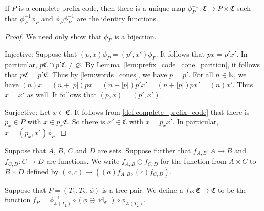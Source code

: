 \begin{lemma}\label{def:cantor_to_prefix_code_cantor}
  If \(P\) is a complete prefix code, then there is a unique map \(\phi_P^{-1}:\mathfrak{C}\to P\times \mathfrak{C}\) such that \(\phi_P^{-1}\phi_P\) and \(\phi_P\phi_P^{-1}\) are the identity functions.
\end{lemma}
\begin{proof}
    We need only show that \(\phi_P\) is a bijection.

    Injective: Suppose that \((p,x)\phi_P=(p',x')\phi_P\). It follows that \(px=p'x'\). In particular, \(p\mathfrak{C}\cap p'\mathfrak{C}\neq \varnothing\).
    By Lemma~\ref{lem:prefix_code=cone_parition}, it follows that \(p\mathfrak{C}= p'\mathfrak{C}\). 
    Thus by \cref{lem:words=cones}, we have \(p=p'\).
    For all \(n\in \mathbb{N}\), we have \((n)x=(n+|p|)px=(n+|p|)p'x'=(n+|p|)px'=(n)x'\). Thus \(x=x'\) as well. It follows that \((p,x)=(p',x')\).

    Surjective: Let \(x\in \mathfrak{C}\). It follows from \cref{def:complete_prefix_code} that there is \(p_x\in P\) with \(x\in p_x\mathfrak{C}\). So there is \(x'\in \mathfrak{C}\) with \(x=p_xx'\). In particular, \(x=(p_x,x')\phi_P\).
\end{proof}

\begin{definition}\label{def:direct_sum_of_functions}
    Suppose that \(A\), \(B\), \(C\) and \(D\) are sets. 
    Suppose further that \(f_{A,B}:A\to B\) and \(f_{C,D}:C\to D\) are functions.
    We write \(f_{A,B}\oplus f_{C,D}\) for the function from \(A\times C\) to \(B\times D\) defined by \((a,c)\mapsto ((a)f_{A,B},(c)f_{C,D})\).
\end{definition}

\begin{definition}\label{def:tree_pair_to_prefix_replacement}
Suppose that \(P=(T_1,T_2,\phi)\) is a tree pair. We define a \(f_P:\mathfrak{C}\to \mathfrak{C}\) to be the function
\(f_P = \phi_{\mathcal{L}(T_1)}^{-1} \circ (\phi \oplus \operatorname{id}_{\mathfrak{C}})\circ \phi_{\mathcal{L}(T_2)}.\)
\end{definition}

